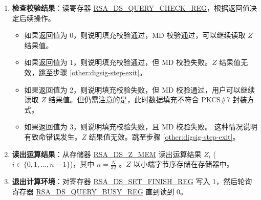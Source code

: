 \documentclass[main\_\_CN.tex]{subfiles}
\begin{document}
\begin{enumerate}
    \item {\bfseries 检查校验结果}：读寄存器 \hyperref[regdesc:RSADSQUERYCHECKREG]{RSA\_DS\_QUERY\_CHECK\_REG}，根据返回值决定后续操作。

    \begin{itemize}

        \item 如果返回值为 0，则说明填充校验通过，MD 校验通过，可以继续读取 \begin{math}Z\end{math} 结果值。

        \item 如果返回值为 1，则说明填充校验通过，但 MD 校验失败。\begin{math}Z\end{math} 结果值无效，跳至步骤 \ref{other:digsig-step-exit}。

        \item 如果返回值为 2，则说明填充校验失败，但 MD 校验通过，用户可以继续读取 \begin{math}Z\end{math} 结果值。但仍需注意的是，此时数据填充不符合 PKCS\#7 封装方式。

        \item 如果返回值为 3，则说明填充校验失败，且 MD 校验失败。 这种情况说明有致命错误发生。\begin{math}Z\end{math} 结果值无效。跳至步骤 \ref{other:digsig-step-exit}。

    \end{itemize}

    \item {\bfseries 读出运算结果}：从存储器 \hyperref[RSADSZMEM]{RSA\_DS\_Z\_MEM} 读出运算结果 \begin{math}Z_{i}\end{math} (\begin{math}i \in \{0,1, \dots,n-1\}\end{math})，其中 \begin{math} n = \frac{N}{32} \end{math} 。\begin{math}Z\end{math} 以小端字节序存储在存储器中。

    \item {\bfseries 退出计算环境\label{other:digsig-step-exit}}：对寄存器 \hyperref[regdesc:RSADSSETFINISHREG]{RSA\_DS\_SET\_FINISH\_REG} 写入 1，然后轮询寄存器 \hyperref[regdesc:RSADSQUERYBUSYREG]{RSA\_DS\_QUERY\_BUSY\_REG} 直到读到 0。

\end{enumerate}
\end{document}
